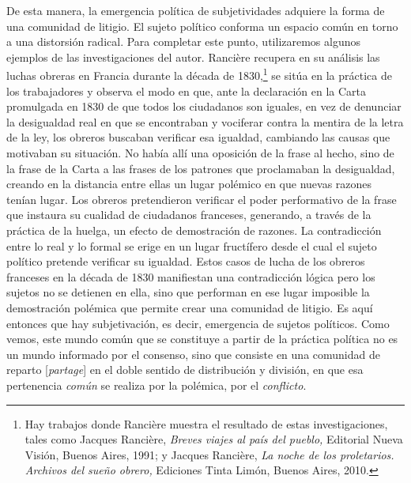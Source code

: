 De esta manera, la emergencia política de subjetividades adquiere la forma de una comunidad de litigio. El sujeto político conforma un espacio común en torno a una distorsión radical. Para completar este punto, utilizaremos algunos ejemplos de las investigaciones del autor. Rancière recupera en su análisis las luchas obreras en Francia durante la década de 1830,\footnote{Hay trabajos donde Rancière muestra el resultado de estas investigaciones, tales como Jacques Rancière, \emph{Breves viajes al país del pueblo,} Editorial Nueva Visión, Buenos Aires, 1991; y Jacques Rancière, \emph{La noche de los proletarios. Archivos del sueño obrero,} Ediciones Tinta Limón, Buenos Aires, 2010.} se sitúa en la práctica de los trabajadores y observa el modo en que, ante la declaración en la Carta promulgada en 1830 de que todos los ciudadanos son iguales, en vez de denunciar la desigualdad real en que se encontraban y vociferar contra la mentira de la letra de la ley, los obreros buscaban verificar esa igualdad, cambiando las causas que motivaban su situación. No había allí una oposición de la frase al hecho, sino de la frase de la Carta a las frases de los patrones que proclamaban la desigualdad, creando en la distancia entre ellas un lugar polémico en que nuevas razones tenían lugar. Los obreros pretendieron verificar el poder performativo de la frase que instaura su cualidad de ciudadanos franceses, generando, a través de la práctica de la huelga, un efecto de demostración de razones. La contradicción entre lo real y lo formal se erige en un lugar fructífero desde el cual el sujeto político pretende verificar su igualdad. Estos casos de lucha de los obreros franceses en la década de 1830 manifiestan una contradicción lógica pero los sujetos no se detienen en ella, sino que performan en ese lugar imposible la demostración polémica que permite crear una comunidad de litigio. Es aquí entonces que hay subjetivación, es decir, emergencia de sujetos políticos. Como vemos, este mundo común que se constituye a partir de la práctica política no es un mundo informado por el consenso, sino que consiste en una comunidad de reparto {[}\emph{partage}{]} en el doble sentido de distribución y división, en que esa pertenencia \emph{común} se realiza por la polémica, por el \emph{conflicto}.

